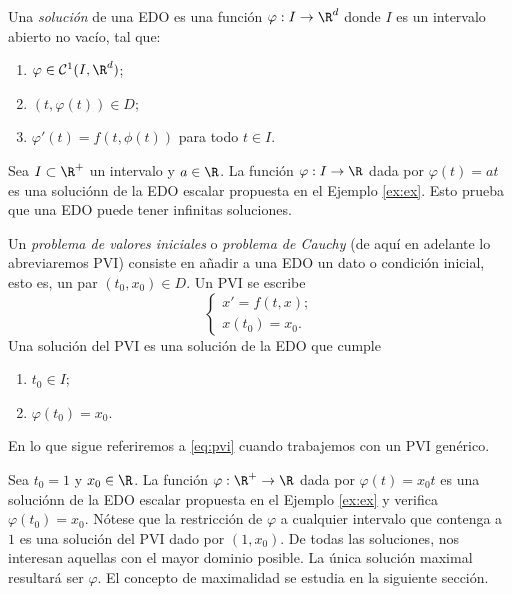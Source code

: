 \documentclass{article}
\begin{document}
  \begin{definition}
    Una \emph{solución} de una EDO es una función $\varphi: I \to \R^d$ donde $I$ es un intervalo
    abierto no vacío, tal que:
    \begin{enumerate}
    \item $\varphi \in \mathcal{C}^1(I, \R^d)$;
    \item $(t, \varphi(t)) \in D$;
    \item $\varphi'(t) = f(t, \phi(t))$ para todo $t \in I$.
    \end{enumerate}
  \end{definition}

  \begin{ex} Sea $I \subset \R^+$ un intervalo y $a \in \R$. La función $\varphi: I \to \R$ dada por
    $\varphi(t) = at$ es una soluciónn de la EDO escalar propuesta en el Ejemplo \ref{ex:ex}. Esto
    prueba que una EDO puede tener infinitas soluciones.
  \end{ex}

  
  \begin{definition}
    Un \emph{problema de valores iniciales} o \emph{problema de Cauchy} (de aquí en adelante lo
    abreviaremos PVI) consiste en añadir a una EDO un dato o condición inicial, esto es, un par
    $(t_0, x_0) \in D$. Un PVI se escribe
    \begin{equation}
      \label{eq:pvi}
      \left\{
        \begin{array}{l}
          x' = f(t,x); \\
          x(t_0) = x_0.
        \end{array}
      \right.
      \tag{P}
    \end{equation}
    Una solución del PVI es una solución de la EDO que cumple
    \begin{enumerate}
    \item $t_0 \in I$;
    \item $\varphi(t_0) = x_0$.
    \end{enumerate}
  \end{definition}

  En lo que sigue referiremos a \eqref{eq:pvi} cuando trabajemos con un PVI genérico.

  \begin{ex} Sea $t_0 = 1$ y $x_0 \in \R$.  La función $\varphi: \R^+ \to \R$ dada por
    $\varphi(t) = x_0t$ es una soluciónn de la EDO escalar propuesta en el Ejemplo \ref{ex:ex} y
    verifica $\varphi(t_0) = x_0$. Nótese que la restricción de $\varphi$ a cualquier intervalo que
    contenga a $1$ es una solución del PVI dado por $(1, x_0)$. De todas las soluciones, nos
    interesan aquellas con el mayor dominio posible. La única solución maximal resultará ser
    $\varphi$. El concepto de maximalidad se estudia en la siguiente sección.
  \end{ex}
\end{document}

